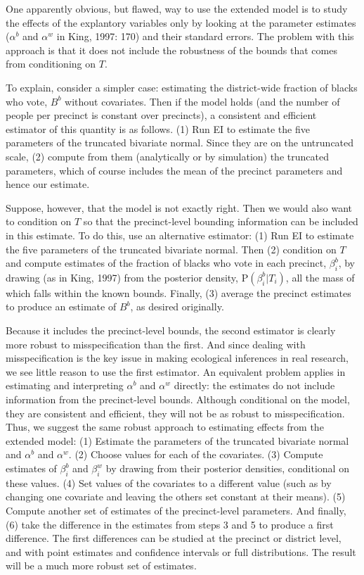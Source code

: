 \documentclass[11pt,titlepage]{article}
\renewcommand{\P}{\text{P}}
\begin{document}
One apparently obvious, but flawed, way to use the extended model is
to study the effects of the explantory variables only by looking at
the parameter estimates ($\alpha^b$ and $\alpha^w$ in King, 1997: 170)
and their standard errors.  The problem with this approach is that it
does not include the robustness of the bounds that comes from
conditioning on $T$.  

To explain, consider a simpler case: estimating the district-wide
fraction of blacks who vote, $B^b$ without covariates.  Then if the
model holds (and the number of people per precinct is constant over
precincts), a consistent and efficient estimator of this quantity is
as follows.  (1) Run EI to estimate the five parameters of the
truncated bivariate normal.  Since they are on the untruncated scale,
(2) compute from them (analytically or by simulation) the truncated
parameters, which of course includes the mean of the precinct
parameters and hence our estimate.

Suppose, however, that the model is not exactly right.  Then we would
also want to condition on $T$ so that the precinct-level bounding
information can be included in this estimate.  To do this, use an
alternative estimator: (1) Run EI to estimate the five parameters of
the truncated bivariate normal.  Then (2) condition on $T$ and compute
estimates of the fraction of blacks who vote in each precinct,
$\beta_i^b$, by drawing (as in King, 1997) from the posterior density,
$\P(\beta_i^b|T_i)$, all the mass of which falls within the known
bounds.  Finally, (3) average the precinct estimates to produce an
estimate of $B^b$, as desired originally.

Because it includes the precinct-level bounds, the second estimator is
clearly more robust to misspecification than the first.  And since
dealing with misspecification is the key issue in making ecological
inferences in real research, we see little reason to use the first
estimator.  An equivalent problem applies in estimating and
interpreting $\alpha^b$ and $\alpha^w$ directly: the estimates do not
include information from the precinct-level bounds.  Although
conditional on the model, they are consistent and efficient, they will
not be as robust to misspecification.  Thus, we suggest the same
robust approach to estimating effects from the extended model: (1)
Estimate the parameters of the truncated bivariate normal and
$\alpha^b$ and $\alpha^w$.  (2) Choose values for each of the
covariates. (3) Compute estimates of $\beta_i^b$ and $\beta_i^w$ by
drawing from their posterior densities, conditional on these values.
(4) Set values of the covariates to a different value (such as by
changing one covariate and leaving the others set constant at their
means). (5) Compute another set of estimates of the precinct-level
parameters.  And finally, (6) take the difference in the estimates
from steps 3 and 5 to produce a first difference.  The first
differences can be studied at the precinct or district level, and with
point estimates and confidence intervals or full distributions.  The
result will be a much more robust set of estimates.
\end{document}

